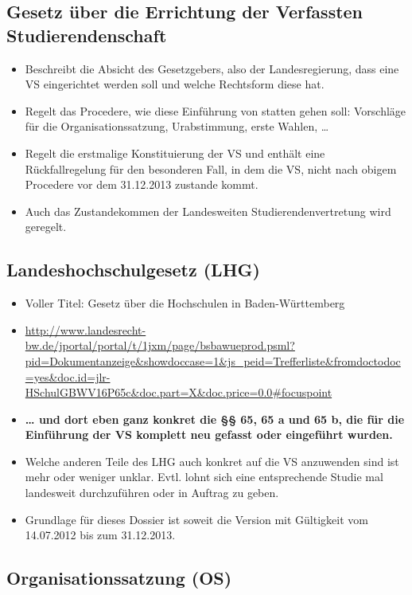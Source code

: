 \documentclass[
10pt,
a4paper,
twoside,								%
titlepage=false,							%
draft=false								%
]{scrartcl}
\begin{document}
\subsection{Gesetz über die Errichtung der Verfassten Studierendenschaft}

\begin{itemize}
	\item Beschreibt die Absicht des Gesetzgebers, also der Landesregierung, dass eine VS eingerichtet werden soll und welche Rechtsform diese hat.
	\item Regelt das Procedere, wie diese Einführung von statten gehen soll: Vorschläge für die Organisationssatzung, Urabstimmung, erste Wahlen, …
	\item Regelt die erstmalige Konstituierung der VS und enthält eine Rückfallregelung für den besonderen Fall, in dem die VS, nicht nach obigem Procedere vor dem 31.12.2013 zustande kommt.
	\item Auch das Zustandekommen der Landesweiten Studierendenvertretung wird geregelt.
\end{itemize}


\subsection{Landeshochschulgesetz (LHG)}
\begin{itemize}
	\item Voller Titel: Gesetz über die Hochschulen in Baden-Württemberg
	\item \sloppy  \url{http://www.landesrecht-bw.de/jportal/portal/t/1jxm/page/bsbawueprod.psml?pid=Dokumentanzeige&showdoccase=1&js_peid=Trefferliste&fromdoctodoc=yes&doc.id=jlr-HSchulGBWV16P65c&doc.part=X&doc.price=0.0#focuspoint}
	\item \textbf{… und dort eben ganz konkret die §§ 65, 65 a und 65 b, die für die Einführung der VS komplett neu gefasst oder eingeführt wurden.}
	\item Welche anderen Teile des LHG auch konkret auf die VS anzuwenden sind ist mehr oder weniger unklar. Evtl. lohnt sich eine entsprechende Studie mal landesweit durchzuführen oder in Auftrag zu geben.
	\item Grundlage für dieses Dossier ist soweit die Version mit Gültigkeit vom 14.07.2012 bis zum 31.12.2013.
\end{itemize}

\subsection{Organisationssatzung (OS)}
\end{document}
